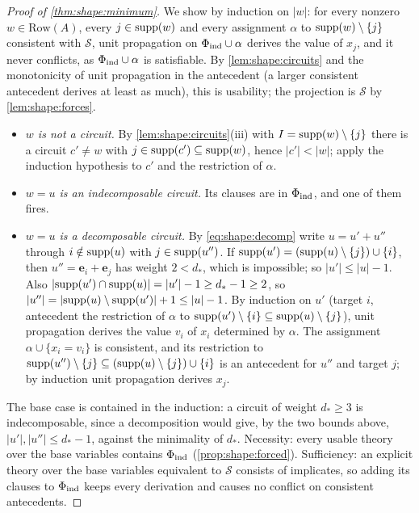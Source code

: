 \begin{proof}[Proof of \cref{thm:shape:minimum}]
We show by induction on $\lvert w\rvert$: for every nonzero $w\in\mathrm{Row}(A)$, every $j\in\operatorname{supp}(w)$ and every assignment $\alpha$ to $\operatorname{supp}(w)\setminus\{j\}$ consistent with $\mathcal S$, unit propagation on $\Phi_{\rm ind}\cup\alpha$ derives the value of $x_j$, and it never conflicts, as $\Phi_{\rm ind}\cup\alpha$ is satisfiable. By \cref{lem:shape:circuits} and the monotonicity of unit propagation in the antecedent (a larger consistent antecedent derives at least as much), this is usability; the projection is $\mathcal S$ by \cref{lem:shape:forces}.
\begin{itemize}[leftmargin=*]
\item \emph{$w$ is not a circuit.} By \cref{lem:shape:circuits}(iii) with $I=\operatorname{supp}(w)\setminus\{j\}$ there is a circuit $c'\ne w$ with $j\in\operatorname{supp}(c')\subseteq\operatorname{supp}(w)$, hence $\lvert c'\rvert<\lvert w\rvert$; apply the induction hypothesis to $c'$ and the restriction of $\alpha$.
\item \emph{$w=u$ is an indecomposable circuit.} Its clauses are in $\Phi_{\rm ind}$, and one of them fires.
\item \emph{$w=u$ is a decomposable circuit.} By \eqref{eq:shape:decomp} write $u=u'+u''$ through $i\notin\operatorname{supp}(u)$ with $j\in\operatorname{supp}(u'')$. If $\operatorname{supp}(u')=(\operatorname{supp}(u)\setminus\{j\})\cup\{i\}$, then $u''=\mathbf e_i+\mathbf e_j$ has weight $2<d_*$, which is impossible; so $\lvert u'\rvert\le\lvert u\rvert-1$. Also $\lvert\operatorname{supp}(u')\cap\operatorname{supp}(u)\rvert=\lvert u'\rvert-1\ge d_*-1\ge2$, so $\lvert u''\rvert=\lvert\operatorname{supp}(u)\setminus\operatorname{supp}(u')\rvert+1\le\lvert u\rvert-1$. By induction on $u'$ (target $i$, antecedent the restriction of $\alpha$ to $\operatorname{supp}(u')\setminus\{i\}\subseteq\operatorname{supp}(u)\setminus\{j\}$), unit propagation derives the value $v_i$ of $x_i$ determined by $\alpha$. The assignment $\alpha\cup\{x_i=v_i\}$ is consistent, and its restriction to $\operatorname{supp}(u'')\setminus\{j\}\subseteq(\operatorname{supp}(u)\setminus\{j\})\cup\{i\}$ is an antecedent for $u''$ and target $j$; by induction unit propagation derives $x_j$.
\end{itemize}
The base case is contained in the induction: a circuit of weight $d_*\ge3$ is indecomposable, since a decomposition would give, by the two bounds above, $\lvert u'\rvert,\lvert u''\rvert\le d_*-1$, against the minimality of $d_*$. Necessity: every usable theory over the base variables contains $\Phi_{\rm ind}$ (\cref{prop:shape:forced}). Sufficiency: an explicit theory over the base variables equivalent to $\mathcal S$ consists of implicates, so adding its clauses to $\Phi_{\rm ind}$ keeps every derivation and causes no conflict on consistent antecedents.
\end{proof}

